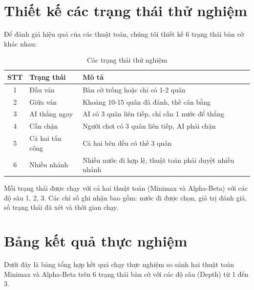\documentclass[12pt,a4paper]{article}
\begin{document}
\section{Thiết kế các trạng thái thử nghiệm}

Để đánh giá hiệu quả của các thuật toán, chúng tôi thiết kế 6 trạng thái bàn cờ khác nhau:

\begin{table}[h]
\centering
\begin{tabular}{|c|l|p{7cm}|}
\hline
\textbf{STT} & \textbf{Trạng thái} & \textbf{Mô tả} \\
\hline
1 & Đầu ván & Bàn cờ trống hoặc chỉ có 1-2 quân \\
\hline
2 & Giữa ván & Khoảng 10-15 quân đã đánh, thế cân bằng \\
\hline
3 & AI thắng ngay & AI có 3 quân liên tiếp, chỉ cần 1 nước để thắng \\
\hline
4 & Cần chặn & Người chơi có 3 quân liên tiếp, AI phải chặn \\
\hline
5 & Cả hai tấn công & Cả hai bên đều có thế 3 quân \\
\hline
6 & Nhiều nhánh & Nhiều nước đi hợp lệ, thuật toán phải duyệt nhiều nhánh \\
\hline
\end{tabular}
\caption{Các trạng thái thử nghiệm}
\end{table}

Mỗi trạng thái được chạy với cả hai thuật toán (Minimax và Alpha-Beta) với các độ sâu 1, 2, 3. Các chỉ số ghi nhận bao gồm: nước đi được chọn, giá trị đánh giá, số trạng thái đã xét và thời gian chạy.

\section{Bảng kết quả thực nghiệm}

Dưới đây là bảng tổng hợp kết quả chạy thực nghiệm so sánh hai thuật toán Minimax và Alpha-Beta trên 6 trạng thái bàn cờ với các độ sâu (Depth) từ 1 đến 3.
\end{document}
